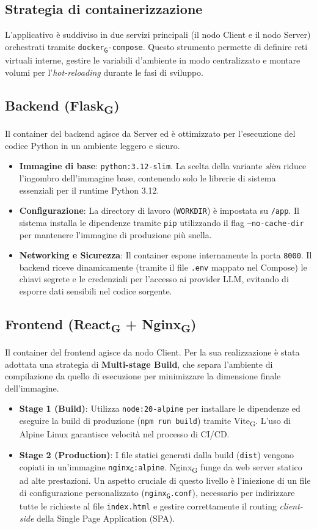 \documentclass[11pt,a4paper]{article}
\newcommand{\gls}[1]{#1\textsubscript{G}}
\begin{document}
\subsection{Strategia di containerizzazione}
L'applicativo è suddiviso in due servizi principali (il nodo Client e il nodo Server) orchestrati tramite \texttt{\gls{docker}-compose}. Questo strumento permette di definire reti virtuali interne, gestire le variabili d'ambiente in modo centralizzato e montare volumi per l'\textit{hot-reloading} durante le fasi di sviluppo.

\subsection{Backend (\gls{Flask})}
Il container del backend agisce da Server ed è ottimizzato per l'esecuzione del codice Python in un ambiente leggero e sicuro.
\begin{itemize}
    \item \textbf{Immagine di base}: \texttt{python:3.12-slim}. La scelta della variante \textit{slim} riduce l'ingombro dell'immagine base, contenendo solo le librerie di sistema essenziali per il runtime Python 3.12.
    \item \textbf{Configurazione}: La directory di lavoro (\texttt{WORKDIR}) è impostata su \texttt{/app}. Il sistema installa le dipendenze tramite \texttt{pip} utilizzando il flag \texttt{--no-cache-dir} per mantenere l'immagine di produzione più snella.
    \item \textbf{Networking e Sicurezza}: Il container espone internamente la porta \texttt{8000}. Il backend riceve dinamicamente (tramite il file \texttt{.env} mappato nel Compose) le chiavi segrete e le credenziali per l'accesso ai provider LLM, evitando di esporre dati sensibili nel codice sorgente.
\end{itemize}

\subsection{Frontend (\gls{React} + \gls{Nginx})}
Il container del frontend agisce da nodo Client. Per la sua realizzazione è stata adottata una strategia di \textbf{Multi-stage Build}, che separa l'ambiente di compilazione da quello di esecuzione per minimizzare la dimensione finale dell'immagine.
\begin{itemize}
    \item \textbf{Stage 1 (Build)}: Utilizza \texttt{node:20-alpine} per installare le dipendenze ed eseguire la build di produzione (\texttt{npm run build}) tramite \gls{Vite}. L'uso di Alpine Linux garantisce velocità nel processo di CI/CD.
    \item \textbf{Stage 2 (Production)}: I file statici generati dalla build (\texttt{dist}) vengono copiati in un'immagine \texttt{\gls{nginx}:alpine}. \gls{Nginx} funge da web server statico ad alte prestazioni. Un aspetto cruciale di questo livello è l'iniezione di un file di configurazione personalizzato (\texttt{\gls{nginx}.conf}), necessario per indirizzare tutte le richieste al file \texttt{index.html} e gestire correttamente il routing \textit{client-side} della Single Page Application (SPA).
\end{itemize}
\end{document}
